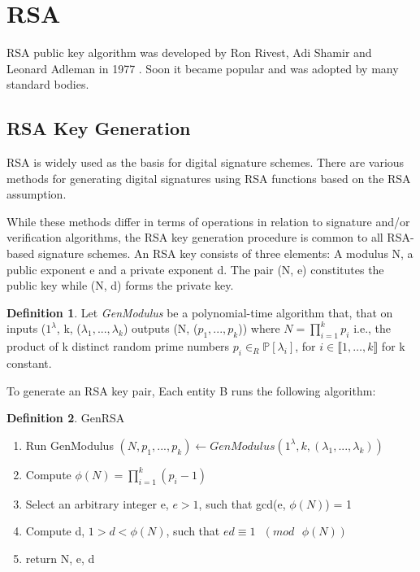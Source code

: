 \documentclass[]{final_report}
\theoremstyle{definition}
\newtheorem{definition}{Definition}[chapter]
\begin{document}
\section{RSA}
RSA public key algorithm was developed by Ron Rivest, Adi Shamir and Leonard Adleman in 1977 \cite{10.1145/359340.359342}. Soon it became popular and was adopted by many standard bodies.
\subsection{RSA Key Generation}
\label{subSec:keygen}
RSA is widely used as the basis for digital signature schemes. There are various methods for generating digital signatures using RSA functions based on the RSA assumption. 

While these methods differ in terms of operations in relation to signature and/or verification algorithms, the RSA key generation procedure is common to all RSA-based signature schemes.  An RSA key consists of three elements: A modulus N, a public exponent e and a private exponent d. The pair (N, e) constitutes the public key while (N, d) forms the private key.

\begin{definition}
Let \textit{GenModulus} be a polynomial-time algorithm that, that on inputs ($1^\lambda$, k, ($\lambda_{1},...,\lambda_{k}$) outputs (N, ($p_{1},...,p_{k}$)) where $N = \displaystyle\prod_{i=1}^{k} p_{i}$ i.e., the product of k distinct random prime numbers $p_i \in_{R} \mathbb{P}[\lambda_i]$, for $i \in \llbracket1, \ldots, k \rrbracket$ for k constant. 
\end{definition}

To generate an RSA key pair, Each entity B runs the following algorithm:

\begin{definition} GenRSA
\label{def:GenRSA}
\begin{mdframed}
\begin{enumerate}
    \item Run GenModulus $(N, p_{1},...,p_{k}) \leftarrow GenModulus(1^\lambda, k, (\lambda_{1},...,\lambda_{k}))$
    \item Compute $\phi(N) = \displaystyle\prod_{i=1}^{k} (p_i - 1)$
    \item Select an arbitrary integer e, $e > 1$, such that gcd(e, $\phi(N)$) = 1 
    \item Compute d, $1 > d < \phi(N)$, such that $ed \equiv 1 \text{ } (mod \text{ } \phi(N))$
    \item return N, e, d
\end{enumerate}
\end{mdframed}
\end{definition}
\end{document}
